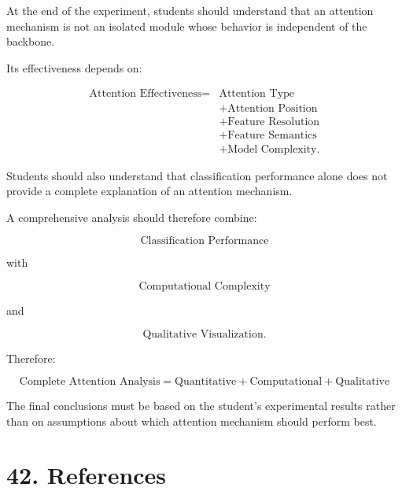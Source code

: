 \documentclass[10pt]{article}
\begin{document}
At the end of the experiment, students should understand that an attention
mechanism is not an isolated module whose behavior is independent of the
backbone.

Its effectiveness depends on:

\[
\boxed{
\begin{aligned}
\text{Attention Effectiveness}
={}&
\text{Attention Type}\\
&+
\text{Attention Position}\\
&+
\text{Feature Resolution}\\
&+
\text{Feature Semantics}\\
&+
\text{Model Complexity}.
\end{aligned}
}
\]

Students should also understand that classification performance alone does
not provide a complete explanation of an attention mechanism.

A comprehensive analysis should therefore combine:

\[
\boxed{
\text{Classification Performance}
}
\]

with

\[
\boxed{
\text{Computational Complexity}
}
\]

and

\[
\boxed{
\text{Qualitative Visualization}.
}
\]

Therefore:

\[
\boxed{
\text{Complete Attention Analysis}
=
\text{Quantitative}
+
\text{Computational}
+
\text{Qualitative}
}
\]

The final conclusions must be based on the student's experimental results
rather than on assumptions about which attention mechanism should perform
best.

\section*{42. References}
\end{document}
